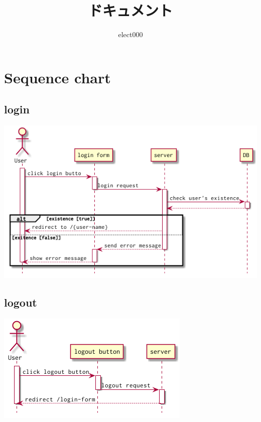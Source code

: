 \documentclass{scrartcl}
\author{elect000}
\date{}
\title{ドキュメント}
\begin{document}
\maketitle
\tableofcontents


\section{Sequence chart}
\label{sec:orgf09497a}
\subsection{login}
\label{sec:org251924d}
\begin{center}
\includegraphics[width=.9\linewidth]{login-seq.png}
\end{center}

\subsection{logout}
\label{sec:org0c01682}
\begin{center}
\includegraphics[width=.9\linewidth]{logout-seq.png}
\end{center}
\end{document}
